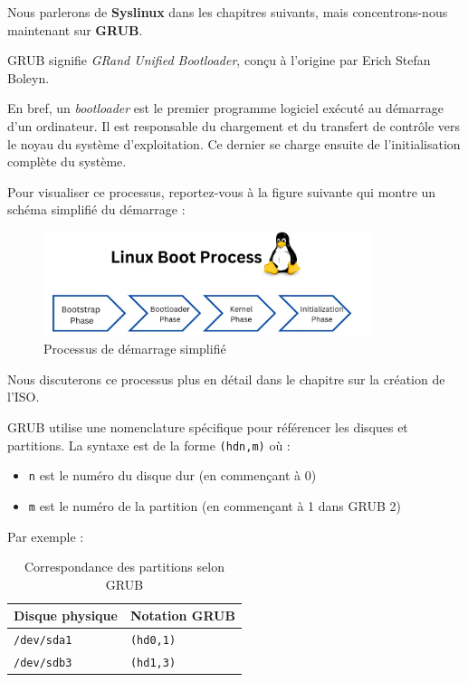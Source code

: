 Nous parlerons de \textbf{Syslinux} dans les chapitres suivants, mais concentrons-nous maintenant sur \textbf{GRUB}.

GRUB signifie \textit{GRand Unified Bootloader}, conçu à l’origine par Erich Stefan Boleyn.

\medskip
\noindent
En bref, un \textit{bootloader} est le premier programme logiciel exécuté au démarrage d’un ordinateur. Il est responsable du chargement et du transfert de contrôle vers le noyau du système d’exploitation.  
Ce dernier se charge ensuite de l’initialisation complète du système.

Pour visualiser ce processus, reportez-vous à la figure suivante qui montre un schéma simplifié du démarrage :

\begin{figure}[H]
  \centering
  \includegraphics[width=0.85\textwidth]{images_pfe/simplebootprocess.png}
  \caption{Processus de démarrage simplifié}
  \label{fig:botprocess}
\end{figure}

Nous discuterons ce processus plus en détail dans le chapitre sur la création de l’ISO.

\bigskip
\noindent
GRUB utilise une nomenclature spécifique pour référencer les disques et partitions.  
La syntaxe est de la forme \texttt{(hdn,m)} où :
\begin{itemize}
  \item \texttt{n} est le numéro du disque dur (en commençant à 0)
  \item \texttt{m} est le numéro de la partition (en commençant à 1 dans GRUB 2)
\end{itemize}

\noindent
Par exemple :

\begin{table}[h!]
    \centering
    \begin{tabular}{|l|l|}
    \hline
    \textbf{Disque physique} & \textbf{Notation GRUB} \\
    \hline
    \texttt{/dev/sda1} & \texttt{(hd0,1)} \\
    \texttt{/dev/sdb3} & \texttt{(hd1,3)} \\
    \hline
    \end{tabular}
    \caption{Correspondance des partitions selon GRUB}
    \label{tab:grub-part}
\end{table}


